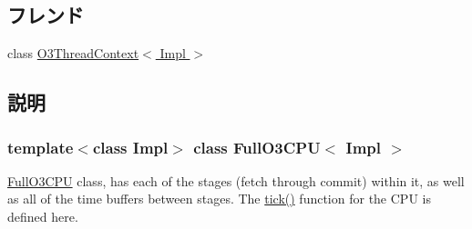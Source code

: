 \subsection*{フレンド}
\begin{DoxyCompactItemize}
\item 
class \hyperlink{classFullO3CPU_a8744c7a2c370330e0f577992900dfb66}{O3ThreadContext$<$ Impl $>$}
\end{DoxyCompactItemize}


\subsection{説明}
\subsubsection*{template$<$class Impl$>$ class FullO3CPU$<$ Impl $>$}

\hyperlink{classFullO3CPU}{FullO3CPU} class, has each of the stages (fetch through commit) within it, as well as all of the time buffers between stages. The \hyperlink{classFullO3CPU_a873dd91783f9efb4a590aded1f70d6b0}{tick()} function for the CPU is defined here. 


